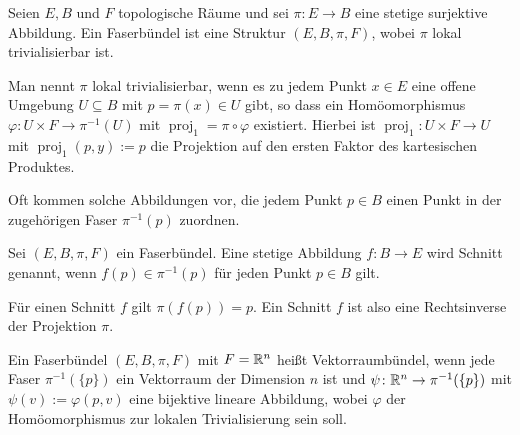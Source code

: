 \begin{definition}[Faserbündel]
Seien $E,B$ und $F$ topologische Räume und sei $\pi\colon E\to B$
eine stetige surjektive Abbildung. Ein Faserbündel ist eine Struktur
$(E,B,\pi,F)$, wobei $\pi$ lokal trivialisierbar ist.

Man nennt $\pi$ lokal trivialisierbar, wenn es zu jedem Punkt
$x\in E$ eine offene Umgebung $U\subseteq B$ mit $p=\pi(x)\in U$
gibt, so dass ein Homöomorphismus $\varphi\colon U\times F\to\pi^{-1}(U)$
mit $\operatorname{proj}_1 = \pi\circ\varphi$ existiert. Hierbei
ist $\operatorname{proj}_1\colon U\times F\to U$ mit
$\operatorname{proj}_1(p,y):=p$ die Projektion auf den ersten Faktor
des kartesischen Produktes.
\end{definition}

\noindent
Oft kommen solche Abbildungen vor, die jedem Punkt $p\in B$ einen Punkt
in der zugehörigen Faser $\pi^{-1}(p)$ zuordnen.

\begin{definition}[Schnitt]
Sei $(E,B,\pi,F)$ ein Faserbündel. Eine stetige Abbildung
$f\colon B\to E$ wird Schnitt genannt, wenn $f(p)\in\pi^{-1}(p)$
für jeden Punkt $p\in B$ gilt.
\end{definition}

\noindent
Für einen Schnitt $f$ gilt $\pi(f(p))=p$. Ein Schnitt $f$ ist also eine
Rechtsinverse der Projektion $\pi$.

\begin{definition}[Vektorraumbündel]
Ein Faserbündel $(E,B,\pi,F)$ mit $F=\mathbb R^n$ heißt Vektorraumbündel, wenn
jede Faser $\pi^{-1}(\{p\})$ ein Vektorraum der Dimension $n$ ist und
$\psi\colon\mathbb R^n\to\pi^{-1}(\{p\})$ mit $\psi(v):=\varphi(p,v)$
eine bijektive lineare Abbildung, wobei $\varphi$ der Homöomorphismus
zur lokalen Trivialisierung sein soll.
\end{definition}




